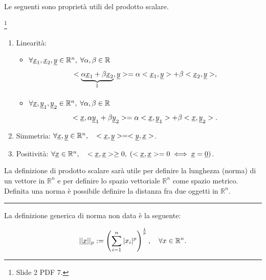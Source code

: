 Le seguenti sono proprietà utili del prodotto scalare.
\begin{property}\footnote{Slide 2 PDF 7.}
    \begin{enumerate}
        \item Linearità:
        \begin{itemize}
            \item $\forall \uline x_1,\uline x_2, \uline y\in\mathbb R^n,\; \forall \alpha,\beta\in\mathbb R$
                \begin{equation*}
                    <\underbrace{\alpha\uline x_1+\beta\uline x_2}_{\footnotemark},\uline y> = \alpha<\uline x_1,\uline y>+\beta <\uline x_2,\uline y>,
                \end{equation*}
            \item $\forall\uline x, \uline y_1,\uline y_2\in\mathbb R^n,\; \forall \alpha,\beta\in\mathbb R$
                \begin{equation*}
                    <\uline x,\alpha\uline y_1+\beta\uline y_2> = \alpha<\uline x,\uline y_1>+\beta <\uline x,\uline y_2>.
                \end{equation*}
        \end{itemize}
        \item Simmetria: $\forall \uline x, \uline y\in\mathbb R^n,\quad <\uline x,\uline y>=<\uline y, \uline x>$.
        \item Positività: $\forall\uline x\in\mathbb R^n,\quad <\uline x,\uline x>\geq 0,\; (<\uline x,\uline x>=0\iff \uline x=\uline 0)$.
    \end{enumerate}
\end{property}

La definizione di prodotto scalare sarà utile per definire la lunghezza (norma) di un vettore in $\mathbb R^n$ e per definire lo spazio vettoriale $\mathbb R^n$ come spazio metrico. Definita una norma è possibile definire la distanza fra due oggetti in $\mathbb R^n$.

\vspace{5px}
\hrule
\vspace{5px}
La definizione generica di norma non data è la seguente:
\begin{definition}[Norma]
    \begin{equation*}
        ||\uline x||_p:=\left(\sum _{i=1}^{n}|x_{i}|^{p}\right)^{\frac {1}{p}},\quad \forall x\in\mathbb R^n.
    \end{equation*}
\end{definition}


